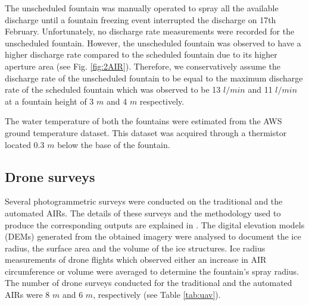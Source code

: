 \documentclass[tc, manuscript]{copernicus}
\begin{document}
The unscheduled fountain was manually operated to spray all the available discharge until a fountain freezing
event interrupted the discharge on 17th February. Unfortunately, no discharge rate measurements were recorded
for the unscheduled fountain. However, the unscheduled fountain was observed to have a higher discharge rate
compared to the scheduled fountain due to its higher aperture area (see Fig. \ref{fig:2AIR}). Therefore, we
conservatively assume the discharge rate of the unscheduled fountain to be equal to the maximum discharge rate
of the scheduled fountain which was observed to be 13 $l/min$ and 11 $l/min$ at a fountain height of 3 $m$ and 4
$m$ respectively.

The water temperature of both the fountains were estimated from the AWS ground temperature dataset. This dataset
was acquired through a thermistor located 0.3 $m$ below the base of the fountain.

\subsection{Drone surveys}

Several photogrammetric surveys were conducted on the traditional and the automated AIRs. The details of these
surveys and the methodology used to produce the corresponding outputs are explained in
\cite{balasubramanianInfluenceMeteorologicalConditions2022}. The digital elevation models (DEMs) generated from
the obtained imagery were analysed to document the ice radius, the surface area and the volume of the ice
structures. Ice radius measurements of drone flights which observed either an increase in AIR circumference or
volume were averaged to determine the fountain's spray radius. The number of drone surveys conducted for the
traditional and the automated AIRs were 8 $m$ and 6 $m$, respectively (see Table \ref{tab:uav}). 
\end{document}
